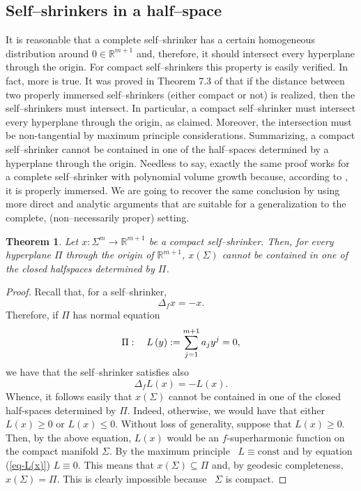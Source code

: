 \documentclass[11pt,leqno]{amsart}\usepackage{amsmath}
\newtheorem{theorem}{Theorem}
\numberwithin{equation}{section}
\begin{document}
\subsection{Self--shrinkers in a half--space}
It is reasonable that a complete self--shrinker has a certain homogeneous distribution around $0\in \mathbb{R}^{m+1}$ and, therefore, it should intersect every hyperplane through the origin. For compact self--shrinkers this property is easily verified. In fact, more is true. It was proved in Theorem 7.3 of \cite{WeWa-JDG} that if the distance between two properly immersed self--shrinkers (either compact or not) is realized, then the self--shrinkers must intersect. In particular, a compact self--shrinker must intersect every hyperplane through the origin, as claimed. Moreover, the intersection must be non-tangential by maximum principle considerations. Summarizing, a compact self--shrinker cannot be contained in one of the half--spaces determined by a hyperplane through the origin. Needless to say, exactly the same proof works for a complete self--shrinker with polynomial volume growth because, according to \cite{ChZh-volume}, it is properly immersed. We are going to recover the same conclusion by using more direct and analytic arguments that are suitable for a generalization to the complete, (non--necessarily proper) setting.

\begin{theorem}
\label{th_halfspace-compact}Let $x\colon \Sigma^{m}\rightarrow\mathbb{R}^{m+1}$ be a
compact self--shrinker. Then, for every hyperplane $\Pi$ through the origin of
$\mathbb{R}^{m+1}$, $x\left(  \Sigma\right)  $ cannot be contained in one of the closed halfspaces determined by $\Pi$.
\end{theorem}

\begin{proof}
Recall that, for a self--shrinker,\[
\Delta_{f}x=-x.
\]
Therefore, if $\Pi$ has normal equation\begin{equation}
\Pi:\text{\quad}L\left(  y\right)  :=\sum_{j=1}^{m+1}a_{j}y^{j}=0,\label{hyperplane}\end{equation}
we have that the self--shrinker satisfies also\begin{equation}
\Delta_{f}L\left(  x\right)  =-L\left(  x\right)  .\label{eq-L(x)}\end{equation}
Whence, it follows easily that $x\left(  \Sigma\right)  $ cannot be contained
in one of the closed half-spaces determined by $\Pi$. Indeed, otherwise, we would
have that either $L\left(  x\right)  \geq0$ or $L\left(  x\right)  \leq0$.
Without loss of generality, suppose that $L\left(  x\right)  \geq0$. Then, by
the above equation, $L\left(  x\right)  $ would be an $f$-superharmonic
function on the compact manifold $\Sigma$. By the maximum principle
\ $L\equiv\mathrm{const}$ and by equation (\ref{eq-L(x)}) $L\equiv0$. This
means that $x\left(  \Sigma\right)  \subseteq\Pi$ and, by geodesic
completeness, $x\left(  \Sigma\right)  =\Pi$. This is clearly impossible
because \ $\Sigma$ is compact.
\end{proof}
\end{document}
